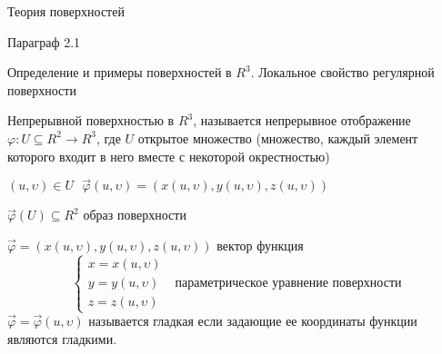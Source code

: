 \begin{title}
  Теория поверхностей
\end{title}

\begin{title}[\Large]
  Параграф 2.1
\end{title}

\begin{title}[\Large]
  Определение и примеры поверхностей в $R^3$. Локальное свойство регулярной
  поверхности
\end{title}

\begin{define}
  Непрерывной поверхностью в $R^3$, называется
  непрерывное отображение $\varphi: U \subseteq R^2 \to R^3$, где
  $U$ открытое множество (множество, каждый элемент которого входит
  в него вместе с некоторой окрестностью)

  $(u, \upsilon) \in U ~~~ \vec \varphi(u, \upsilon) = (x(u, \upsilon),
  y(u, \upsilon), z(u, \upsilon))$

  $\vec \varphi (U) \subseteq R^2$ образ поверхности

  $\vec \varphi = (x(u, \upsilon), y(u, \upsilon), z(u, \upsilon))$ вектор
  функция
  $$
  \left\{
  \begin{array}{c}
    x = x(u, \upsilon) \\
    y = y(u, \upsilon) \\
    z = z(u, \upsilon)
  \end{array}
  \right. ~~~ \text{параметрическое уравнение поверхности}
  $$
  $\vec \varphi = \vec \varphi(u, \upsilon)$ называется гладкая если
  задающие ее координаты функции являются гладкими.
\end{define}

